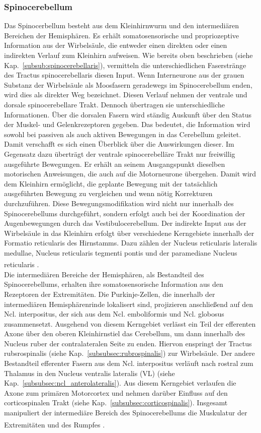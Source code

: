 \subsubsection*{Spinocerebellum} 
Das Spinocerbellum besteht aus dem Kleinhirnwurm und den intermediären Bereichen der Hemisphären. Es erhält somatosensorische und propriozeptive Information aus der Wirbelsäule, die entweder einen direkten oder einen indirekten Verlauf zum Kleinhirn aufweisen. Wie bereits oben beschrieben (siehe Kap.~\ref{subsub:spinocerebellaris}), vermitteln  die unterschiedlichen Faserstränge des Tractus spinocerebellaris diesen Input. Wenn Interneurone aus der grauen Substanz der Wirbelsäule als Moosfasern geradewegs im Spinocerebellum enden, wird dies als direkter Weg bezeichnet. Diesen Verlauf nehmen der ventrale und dorsale spinocerebellare Trakt. Dennoch übertragen sie unterschiedliche Informationen. Über die dorsalen Fasern wird ständig Auskunft über den Status der Muskel- und Gelenkrezeptoren gegeben. Das bedeutet, die Information wird sowohl bei passiven als auch aktiven Bewegungen in das Cerebellum geleitet. Damit verschafft es sich einen Überblick über die Auswirkungen dieser. Im Gegensatz dazu überträgt der ventrale spinocerebelläre Trakt nur freiwillig ausgeführte Bewegungen. Er erhält an seinem Ausgangspunkt dieselben motorischen Anweisungen, die auch auf die Motorneurone übergehen. Damit wird dem Kleinhirn ermöglicht, die geplante Bewegung mit der tatsächlich ausgeführten Bewegung zu vergleichen und wenn nötig Korrekturen durchzuführen. Diese Bewegungsmodifikation wird nicht nur innerhalb des Spinocerebellums durchgeführt, sondern erfolgt auch bei der Koordination der Augenbewegungen durch das Vestibulocerebellum. Der indirekte Input aus der Wirbelsäule in das Kleinhirn erfolgt über verschiedene Kerngebiete innerhalb der Formatio reticularis des Hirnstamms. Dazu zählen der Nucleus reticularis lateralis medullae, Nucleus reticularis tegmenti pontis und der paramediane Nucleus reticularis \textsuperscript{\cite[Kap.~42]{kandel2013principles}}. \\ 
Die intermediären Bereiche der Hemisphären, als Bestandteil des Spinocerebellums, erhalten ihre somatosensorische Information aus den Rezeptoren der Extremitäten. Die Purkinje-Zellen, die innerhalb der intermediären Hemisphärenrinde lokalisert sind, projizieren anschließend auf den Ncl. interpositus, der sich aus dem Ncl. emboliformis und Ncl. globosus zusammensetzt. Ausgehend von diesem Kerngebiet verlässt ein Teil der efferenten Axone über den oberen Kleinhirnstiel das Cerebellum, um dann innerhalb des Nucleus ruber der contralateralen Seite zu enden. Hiervon enspringt der Tractus rubsrospinalis (siehe Kap.~\ref{subsubsec:rubrospinalis}) zur Wirbelsäule. Der andere Bestandteil efferenter Fasern aus dem Ncl. interpositus verläuft nach rostral zum Thalamus in den Nucleus ventralis lateralis (VL) (siehe Kap.~\ref{subsubsec:ncl_anterolateralis}). Aus diesem Kerngebiet verlaufen die Axone zum primären Motorcortex und nehmen darüber Einfluss auf den corticospinalen Trakt (siehe Kap.~\ref{subsubsec:corticospinalis}). Insgesamt manipuliert der intermediäre Bereich des Spinocerebellums die Muskulatur der Extremitäten und des Rumpfes \textsuperscript{\cite[Kap.~42]{kandel2013principles}}. \\   
